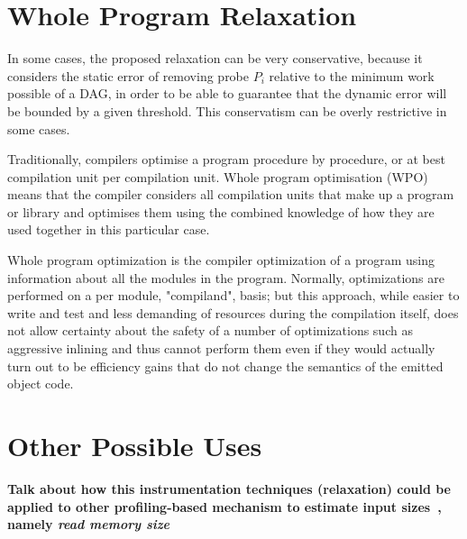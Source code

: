\section{Whole Program Relaxation}

In some cases, the proposed relaxation can be very conservative, because it considers the static error of removing probe $P_i$ relative to the minimum work possible of a DAG, in order to be able to guarantee that the dynamic error will be bounded by a given threshold.
This conservatism can be overly restrictive in some cases.

Traditionally, compilers optimise a program procedure by procedure, or at best compilation unit per compilation unit. Whole program optimisation (WPO) means that the compiler considers all compilation units that make up a program or library and optimises them using the combined knowledge of how they are used together in this particular case.

Whole program optimization is the compiler optimization of a program using information about all the modules in the program. Normally, optimizations are performed on a per module, "compiland", basis; but this approach, while easier to write and test and less demanding of resources during the compilation itself, does not allow certainty about the safety of a number of optimizations such as aggressive inlining and thus cannot perform them even if they would actually turn out to be efficiency gains that do not change the semantics of the emitted object code.



\section{Other Possible Uses}

\textbf{Talk about how this instrumentation techniques (relaxation) could be applied to other profiling-based mechanism to estimate input sizes~\citep{zaparanuks12,coppa14}, namely \textit{read memory size}}
